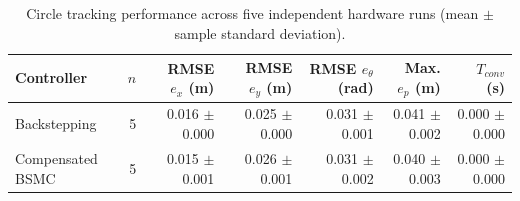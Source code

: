 \begin{table}[!t]
\centering
\caption{Circle tracking performance across five independent hardware runs (mean $\pm$ sample standard deviation).}
\label{tab:tracking}
\begin{tabular}{lrrrrrr}
\hline
Controller & $n$ & RMSE $e_x$ (m) & RMSE $e_y$ (m) & RMSE $e_\theta$ (rad) & Max. $e_p$ (m) & $T_{conv}$ (s) \\
\hline
Backstepping & 5 & 0.016 $\pm$ 0.000 & 0.025 $\pm$ 0.000 & 0.031 $\pm$ 0.001 & 0.041 $\pm$ 0.002 & 0.000 $\pm$ 0.000 \\
Compensated BSMC & 5 & 0.015 $\pm$ 0.001 & 0.026 $\pm$ 0.001 & 0.031 $\pm$ 0.002 & 0.040 $\pm$ 0.003 & 0.000 $\pm$ 0.000 \\
\hline
\end{tabular}
\end{table}
